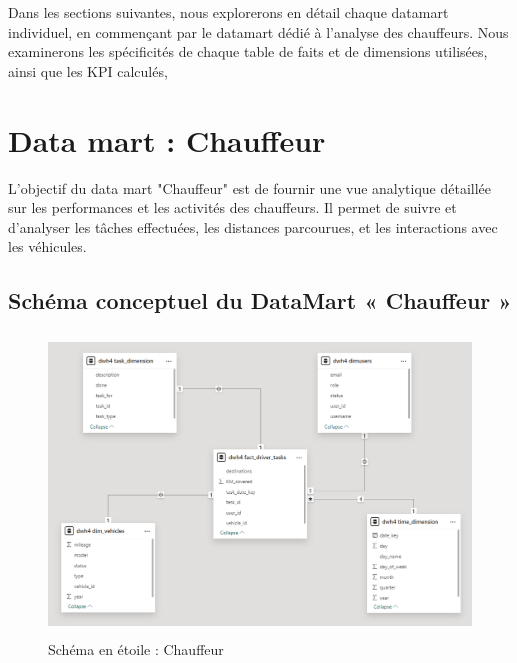 Dans les sections suivantes, nous explorerons en détail chaque datamart individuel, en commençant par le datamart dédié à l'analyse des chauffeurs. Nous examinerons les spécificités de chaque table de faits et de dimensions utilisées, ainsi que les KPI calculés,\\
























\newpage
\section{Data mart : Chauffeur}
L’objectif du data mart "Chauffeur" est de fournir une vue analytique détaillée sur les performances et les activités des chauffeurs. Il permet de suivre et d'analyser les tâches effectuées, les distances parcourues, et les interactions avec les véhicules.
\subsection{ Schéma conceptuel du DataMart « Chauffeur »}
\begin{figure}[h!]
    \centering
    \includegraphics[width=1\textwidth,height=8cm]{chap6.images/mart driver.png}
    \caption{ Schéma en étoile : Chauffeur}

\end{figure}

